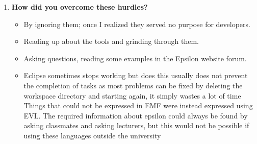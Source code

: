 \documentclass[12pt, a4paper]{report}
\begin{document}
\begin{appendices}
\begin{enumerate}
\item  \textbf{How did you overcome these hurdles?}
\begin{itemize}
\item By ignoring them; once I realized they served no purpose for developers.
\item Reading up about the tools and grinding through them.
\item Asking questions, reading some examples in the Epsilon website forum.
\item Eclipse sometimes stops working but does this usually does not prevent the completion of tasks as most problems can be fixed by deleting the workspace directory and starting again, it simply wastes a lot of time Things that could not be expressed in EMF were instead expressed using EVL. The required information about epsilon could always be found by
asking classmates and asking lecturers, but this would not be possible if using these languages outside the university
\end{itemize}


\end{enumerate}

\end{appendices}
\end{document}
